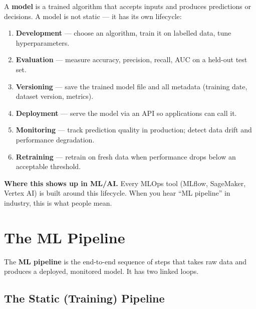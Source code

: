 \documentclass[a4paper,11pt]{article}
\newcommand{\vocab}[1]{\textbf{\color{navy}#1}}
\begin{document}
A \vocab{model} is a trained algorithm that accepts inputs and produces predictions or decisions. A model is not static — it has its own lifecycle:

\begin{enumerate}
  \item \textbf{Development} — choose an algorithm, train it on labelled data, tune hyperparameters.
  \item \textbf{Evaluation} — measure accuracy, precision, recall, AUC on a held-out test set.
  \item \textbf{Versioning} — save the trained model file and all metadata (training date, dataset version, metrics).
  \item \textbf{Deployment} — serve the model via an API so applications can call it.
  \item \textbf{Monitoring} — track prediction quality in production; detect data drift and performance degradation.
  \item \textbf{Retraining} — retrain on fresh data when performance drops below an acceptable threshold.
\end{enumerate}

\noindent\textbf{Where this shows up in ML/AI.} Every MLOps tool (MLflow, SageMaker, Vertex AI) is built around this lifecycle. When you hear ``ML pipeline'' in industry, this is what people mean.

\section{The ML Pipeline}

The \vocab{ML pipeline} is the end-to-end sequence of steps that takes raw data and produces a deployed, monitored model. It has two linked loops.

\subsection{The Static (Training) Pipeline}

\begin{center}
\end{center}
\end{document}
